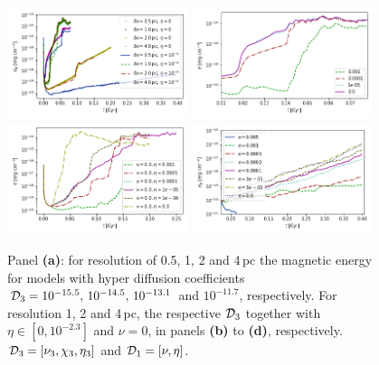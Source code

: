 \documentclass[iop,apj,numberedappendix,twocolappendix]{emulateapj}
\begin{document}
\begin{figure}
\centering
\includegraphics[trim=0.0cm 0.0cm 0.0cm 0.0cm,clip=true,width=0.47\textwidth]{csc_figs/eB-res-4eta.png}
\includegraphics[trim=0.0cm 0.0cm 0.0cm 0.0cm,clip=true,width=0.47\textwidth]{csc_figs/1pc-eB-nu.png}
\includegraphics[trim=0.0cm 0.0cm 0.0cm 0.0cm,clip=true,width=0.47\textwidth]{csc_figs/2pc-eB-nu.png}
\includegraphics[trim=0.0cm 0.0cm 0.0cm 0.0cm,clip=true,width=0.47\textwidth]{csc_figs/4pc-eB-nu.png}
\caption{
Panel {\bf(a)}: for resolution of 0.5, 1, 2 and 4\,pc the magnetic energy for
models with hyper diffusion coefficients 
${\cal{D}}_{3}=10^{-15.5},\,10^{-14.5},\,10^{-13.1}$ and $10^{-11.7}$,
respectively.
For resolution 1, 2  and 4\,pc, the respective ${\cal{D}}_{3}$ together with 
$\eta\in[0,10^{-2.3}]$ and $\nu=0$, in panels {\bf(b)} to {\bf(d)},
respectively.
${\cal{D}}_{3}=[\nu_3,\chi_3,\eta_3]$ and ${\cal{D}}_1=[\nu,\eta]$.
\label{fig:brms}
}
\end{figure}
\end{document}
